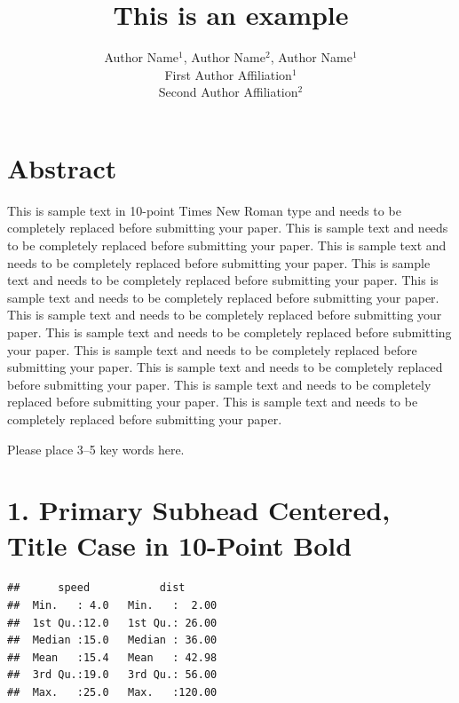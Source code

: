 \documentclass[]{asaproc}
\author{}
\date{\vspace{-2.5em}}
\begin{document}
\title{This is an example}

\author{Author Name$^1$, Author Name$^2$, Author Name$^1$\\
First Author Affiliation$^1$\\
Second Author Affiliation$^2$}

\maketitle

\section*{Abstract}

This is sample text in 10-point Times New Roman type and needs to be
completely replaced before submitting your paper. This is sample text
and needs to be completely replaced before submitting your paper. This
is sample text and needs to be completely replaced before submitting
your paper. This is sample text and needs to be completely replaced
before submitting your paper. This is sample text and needs to be
completely replaced before submitting your paper. This is sample text
and needs to be completely replaced before submitting your paper. This
is sample text and needs to be completely replaced before submitting
your paper. This is sample text and needs to be completely replaced
before submitting your paper. This is sample text and needs to be
completely replaced before submitting your paper. This is sample text
and needs to be completely replaced before submitting your paper. This
is sample text and needs to be completely replaced before submitting
your paper.

\begin{keywords}
Please place 3--5 key words here.
\end{keywords}

\section*{1. Primary Subhead Centered, Title Case in 10-Point Bold}

\begin{verbatim}
##      speed           dist       
##  Min.   : 4.0   Min.   :  2.00  
##  1st Qu.:12.0   1st Qu.: 26.00  
##  Median :15.0   Median : 36.00  
##  Mean   :15.4   Mean   : 42.98  
##  3rd Qu.:19.0   3rd Qu.: 56.00  
##  Max.   :25.0   Max.   :120.00
\end{verbatim}
\end{document}
